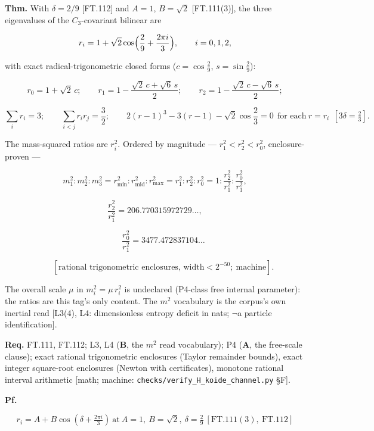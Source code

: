 \begin{theorem}\label{tag:FT-113}
\textbf{Thm.} With $\delta=2/9$ [FT.112] and $A=1$, $B=\sqrt2$ [FT.111(3)], the three eigenvalues of the $C_3$-covariant bilinear are

\[
r_i=1+\sqrt2\cos\Bigl(\frac29+\frac{2\pi i}{3}\Bigr),\qquad i=0,1,2,
\]

with exact radical-trigonometric closed forms ($c=\cos\tfrac29$, $s=\sin\tfrac29$):

\[
r_0=1+\sqrt2\,c;\qquad r_1=1-\frac{\sqrt2\,c+\sqrt6\,s}{2};\qquad r_2=1-\frac{\sqrt2\,c-\sqrt6\,s}{2};
\]

\[
\sum_{i}r_i=3;\qquad\sum_{i<j}r_ir_j=\frac32;\qquad 2(r-1)^3-3(r-1)-\sqrt2\cos\frac23=0\ \ \text{for each}\ r=r_i\ \ [3\delta=\tfrac23].
\]

The mass-squared ratios are $r_i^2$. Ordered by magnitude — $r_1^2<r_2^2<r_0^2$, enclosure-proven —

\[
m_1^2:m_2^2:m_3^2=r_{\min}^2:r_{\mathrm{mid}}^2:r_{\max}^2=r_1^2:r_2^2:r_0^2=1:\frac{r_2^2}{r_1^2}:\frac{r_0^2}{r_1^2},
\]

\[
\frac{r_2^2}{r_1^2}=206.770315972729\ldots,
\]

\[
\qquad \frac{r_0^2}{r_1^2}=3477.472837104\ldots
\]

\[
\qquad [\text{rational trigonometric enclosures, width}<2^{-50};\ \text{machine}].
\]

The overall scale $\mu$ in $m_i^2=\mu\,r_i^2$ is undeclared (P4-class free internal parameter): the ratios are this tag's only content. The $m^2$ vocabulary is the corpus's own inertial read [L3(4), L4: dimensionless entropy deficit in nats; $\neg$a particle identification].

\textbf{Req.} FT.111, FT.112; L3, L4 (\textbf{B}, the $m^2$ read vocabulary); P4 (\textbf{A}, the free-scale clause); exact rational trigonometric enclosures (Taylor remainder bounds), exact integer square-root enclosures (Newton with certificates), monotone rational interval arithmetic [math; machine: \texttt{checks/\allowbreak{}verify\_\allowbreak{}H\_\allowbreak{}koide\_\allowbreak{}channel.py} §F].

\textbf{Pf.}

\[
r_i=A+B\cos(\delta+\tfrac{2\pi i}3)\ \text{at}\ A=1,\ B=\sqrt2,\ \delta=\tfrac29\ [\mathrm{FT.111}(3),\ \mathrm{FT.112}]
\]


\end{theorem}
